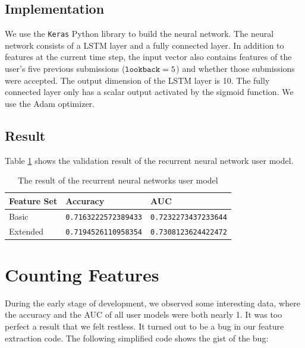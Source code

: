     \subsection{Implementation}

        We use the \verb|Keras|\cite{chollet2015keras} Python library to build the neural network.
        The neural network consists of a LSTM layer and a fully connected layer.
        In addition to features at the current time step,
        the input vector also contains features of the user's five previous submissions ($\verb|lookback| = 5$)
        and whether those submissions were accepted.
        The output dimension of the LSTM layer is 10.
        The fully connected layer only has a scalar output activated by the sigmoid function.
        We use the Adam optimizer\cite{kingma_adam:_2014}.

    \subsection{Result}

        Table \ref{table:rnn result} shows the validation result of the recurrent neural network user model.

        \begin{table}[hpbt]
        \centering
        \begin{tabular}{lll}
            \hline
            Feature Set & Accuracy & AUC \\
            \hline
            Basic    & \verb|0.7163222572389433| & \verb|0.7232273437233644| \\
            Extended & \verb|0.7194526110958354| & \verb|0.7308123624422472| \\
            \hline
        \end{tabular}
        \caption{The result of the recurrent neural networks user model}
        \label{table:rnn result}
        \end{table}

\section{Counting Features}

    During the early stage of development, we observed some interesting data,
    where the accuracy and the AUC of all user models were both nearly 1.
    It was too perfect a result that we felt restless.
    It turned out to be a bug in our feature extraction code.
    The following simplified code shows the gist of the bug:


